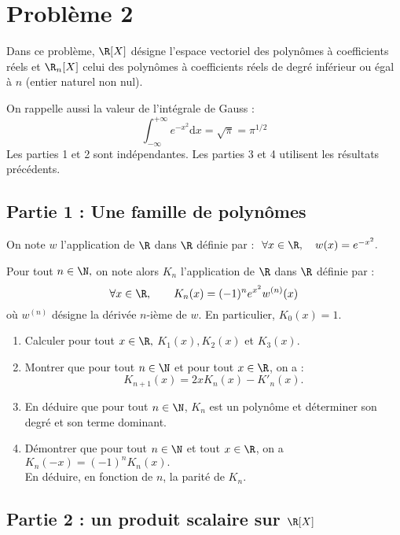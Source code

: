 \documentclass[twoside,french,11pt]{VcCours}
\newcommand{\dx}{\text{d}x}
\begin{document}
\section*{Problème 2}

Dans ce problème, $\R[X]$ désigne l'espace vectoriel des polynômes à coefficients réels et $\R_n[X]$ celui des polynômes à coefficients réels de degré inférieur ou égal à $n$ (entier naturel non nul).

\medskip
On rappelle aussi la valeur de l'intégrale de Gauss :
$$\int_{-\infty}^{+\infty}e^{-x^2} \dx=\sqrt{\pi}=\pi^{1/2}$$
Les parties 1 et 2 sont indépendantes. Les parties 3 et 4 utilisent les résultats précédents.

\subsection*{Partie 1 : Une famille de polynômes}

On note $w$ l'application de $\R$ dans $\R$ définie par :
$\ \forall x\in\R,\quad w(x)=e^{-x^2}.$

Pour tout $n\in\N,$ on note alors $K_n$ l'application  de $\R$ dans $\R$ définie par :
$$\forall x\in\R,\qquad K_n(x)=(-1)^ne^{x^2}w^{(n)}(x)$$
où $w^{(n)}$ désigne la dérivée $n$-ième de $w$. En particulier, $K_0(x)=1.$

\begin{enumerate}
	\item Calculer pour tout $x\in\R,$ $K_1(x), K_2(x)$ et $K_3(x).$
	\item Montrer que pour tout $n\in\N$ et pour tout $x\in\R$, on a :
	$$K_{n+1}(x)=2xK_n(x)-K'_n(x).$$
	\item En déduire que pour tout $n\in\N$, $K_n$ est un polynôme et déterminer son degré et son terme dominant.
	\item Démontrer que pour tout $n\in\N$ et tout $x\in\R$, on a $K_n(-x)=(-1)^nK_n(x).$\\
	En déduire, en fonction de $n$, la parité de $K_n.$
	
\end{enumerate}

\subsection*{Partie 2 : un produit scalaire sur $\R[X]$}
\end{document}
